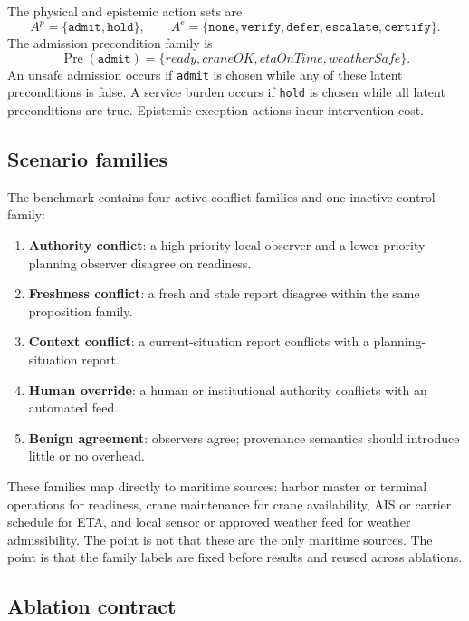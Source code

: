 \documentclass[11pt]{article}
\newcommand{\1}{\mathbf{1}}
\theoremstyle{definition}
\theoremstyle{plain}
\theoremstyle{remark}
\begin{document}
The physical and epistemic action sets are
\[
A^p=\{\texttt{admit},\texttt{hold}\},
\qquad
A^e=\{\texttt{none},\texttt{verify},\texttt{defer},\texttt{escalate},\texttt{certify}\}.
\]
The admission precondition family is
\[
\operatorname{Pre}(\texttt{admit})=
\{ready, craneOK, etaOnTime, weatherSafe\}.
\]
An unsafe admission occurs if \texttt{admit} is chosen while any of these latent preconditions is false. A service burden occurs if \texttt{hold} is chosen while all latent preconditions are true. Epistemic exception actions incur intervention cost.

\subsection{Scenario families}

The benchmark contains four active conflict families and one inactive control family:
\begin{enumerate}[leftmargin=1.6em]
  \item \textbf{Authority conflict}: a high-priority local observer and a lower-priority planning observer disagree on readiness.
  \item \textbf{Freshness conflict}: a fresh and stale report disagree within the same proposition family.
  \item \textbf{Context conflict}: a current-situation report conflicts with a planning-situation report.
  \item \textbf{Human override}: a human or institutional authority conflicts with an automated feed.
  \item \textbf{Benign agreement}: observers agree; provenance semantics should introduce little or no overhead.
\end{enumerate}

These families map directly to maritime sources: harbor master or terminal operations for readiness, crane maintenance for crane availability, AIS or carrier schedule for ETA, and local sensor or approved weather feed for weather admissibility. The point is not that these are the only maritime sources. The point is that the family labels are fixed before results and reused across ablations.

\subsection{Ablation contract}
\end{document}
